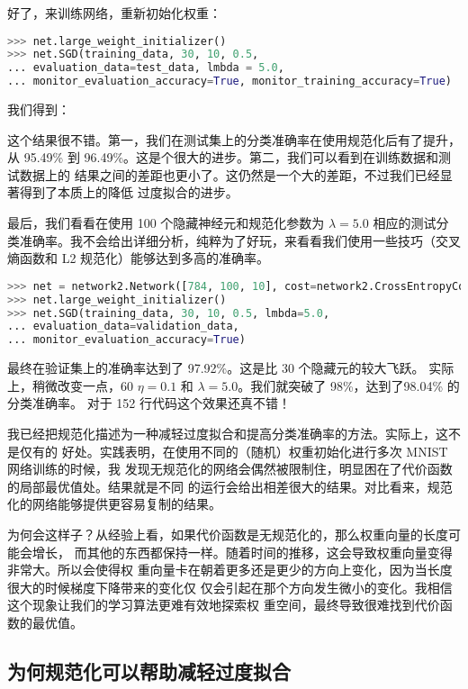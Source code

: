 好了，来训练网络，重新初始化权重：

\begin{lstlisting}[language=Python]
>>> net.large_weight_initializer()
>>> net.SGD(training_data, 30, 10, 0.5,
... evaluation_data=test_data, lmbda = 5.0,
... monitor_evaluation_accuracy=True, monitor_training_accuracy=True)
\end{lstlisting}

我们得到：

这个结果很不错。第一，我们在测试集上的分类准确率在使用规范化后有了提升，从
95.49\% 到 96.49\%。这是个很大的进步。第二，我们可以看到在训练数据和测试数据上的
结果之间的差距也更小了。这仍然是一个大的差距，不过我们已经显著得到了本质上的降低
过度拟合的进步。

最后，我们看看在使用 100 个隐藏神经元和规范化参数为 $\lambda = 5.0$ 相应的测试分
类准确率。我不会给出详细分析，纯粹为了好玩，来看看我们使用一些技巧（交叉熵函数和
  L2 规范化）能够达到多高的准确率。

\begin{lstlisting}[language=Python]
>>> net = network2.Network([784, 100, 10], cost=network2.CrossEntropyCost)
>>> net.large_weight_initializer()
>>> net.SGD(training_data, 30, 10, 0.5, lmbda=5.0,
... evaluation_data=validation_data,
... monitor_evaluation_accuracy=True)
\end{lstlisting}

最终在验证集上的准确率达到了 97.92\%。这是比 30 个隐藏元的较大飞跃。
\label{chap3_98_04_percent}实际上，稍微改变一点，60 \epochs{} $\eta=0.1$ 和
$\lambda = 5.0$。我们就突破了 98\%，达到了98.04\% 的分类准确率\label{98percent}。
对于 152 行代码这个效果还真不错！

我已经把规范化描述为一种减轻过度拟合和提高分类准确率的方法。实际上，这不是仅有的
好处。实践表明，在使用不同的（随机）权重初始化进行多次 MNIST 网络训练的时候，我
发现无规范化的网络会偶然被限制住，明显困在了代价函数的局部最优值处。结果就是不同
的运行会给出相差很大的结果。对比看来，规范化的网络能够提供更容易复制的结果。

为何会这样子？从经验上看，如果代价函数是无规范化的，那么权重向量的长度可能会增长，
而其他的东西都保持一样。随着时间的推移，这会导致权重向量变得非常大。所以会使得权
重向量卡在朝着更多还是更少的方向上变化，因为当长度很大的时候梯度下降带来的变化仅
仅会引起在那个方向发生微小的变化。我相信这个现象让我们的学习算法更难有效地探索权
重空间，最终导致很难找到代价函数的最优值。

\subsection{为何规范化可以帮助减轻过度拟合}

